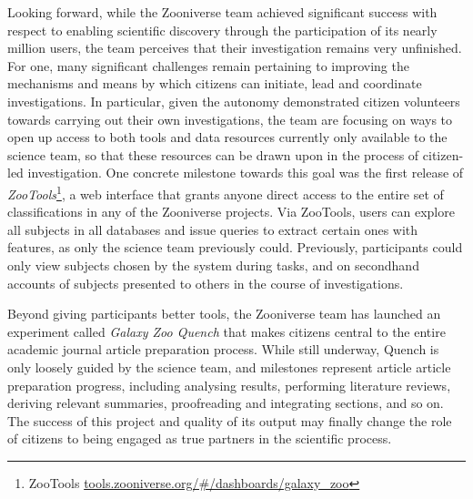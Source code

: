 \documentclass{sigchi}
\begin{document}

Looking forward, while the Zooniverse team achieved significant success with respect to enabling scientific discovery through the participation of its nearly million users, the team perceives that their investigation remains very unfinished.  For one, many significant challenges remain pertaining to improving the mechanisms and means by which citizens can initiate, lead and coordinate investigations.  In particular, given the autonomy demonstrated citizen volunteers towards carrying out their own investigations, the team are focusing on ways to open up access to both tools and data resources currently only available to the science team, so that these resources can be drawn upon in the process of citizen-led investigation.  One concrete milestone towards this goal was the first release of \emph{ZooTools}\footnote{ZooTools \url{tools.zooniverse.org/\#/dashboards/galaxy_zoo}}, a web interface that grants anyone direct access to the entire set of classifications in any of the Zooniverse projects.  Via ZooTools, users can explore all subjects in all databases and issue queries to extract certain ones with features, as only the science team previously could.  Previously, participants could only view subjects chosen by the system during tasks, and on secondhand accounts of subjects presented to others in the course of investigations.

Beyond giving participants better tools, the Zooniverse team has launched an experiment called \emph{Galaxy Zoo Quench} that makes citizens central to the entire academic journal article preparation process.  While still underway, Quench is only loosely guided by the science team, and milestones represent article article preparation progress, including analysing results, performing literature reviews, deriving relevant summaries, proofreading and integrating sections, and so on.  The success of this project and quality of its output may finally change the role of citizens to being engaged as true partners in the scientific process. 
\end{document}
